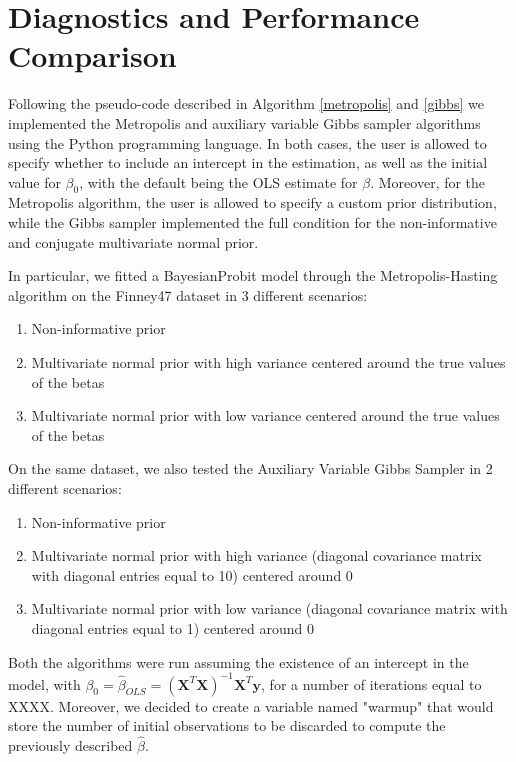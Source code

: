 \documentclass{article}
\renewcommand{\vec}[1]{\mathbf{#1}}
\begin{document}
\section{Diagnostics and Performance Comparison}

Following the pseudo-code described in Algorithm \ref{metropolis} and \ref{gibbs} we implemented the Metropolis and auxiliary variable Gibbs sampler algorithms using the Python programming language. In both cases, the user is allowed to specify whether to include an intercept in the estimation, as well as the initial value for \(\beta_0\), with the default being the OLS estimate for \(\beta\). Moreover, for the Metropolis algorithm, the user is allowed to specify a custom prior distribution, while the Gibbs sampler implemented the full condition for the non-informative and conjugate multivariate normal prior. 

In particular, we fitted a BayesianProbit model through the Metropolis-Hasting algorithm  on the Finney47 dataset \cite{finney1947estimation} in 3 different scenarios:
\begin{enumerate}
    \item Non-informative prior 
    \item Multivariate normal prior with high variance centered around the true values of the betas
    \item Multivariate normal prior with low variance centered around the true values of the betas
\end{enumerate}

On the same dataset, we also tested the Auxiliary Variable Gibbs Sampler in 2 different scenarios:
\begin{enumerate}
    \item Non-informative prior
    \item Multivariate normal prior with high variance (diagonal covariance matrix with diagonal entries equal to 10) centered around 0
    \item Multivariate normal prior with low variance (diagonal covariance matrix with diagonal entries equal to 1) centered around 0
\end{enumerate}

Both the algorithms were run assuming the existence of an intercept in the model, with \(\beta_0 = \hat\beta_{OLS} = (\vec{X}^T \vec{X})^{-1}\vec{X}^T \vec{y}\), for a number of iterations equal to XXXX. Moreover, we decided to create a variable named "warmup" that would store the number of initial observations to be discarded to compute the previously described \(\hat\beta\).
\end{document}

